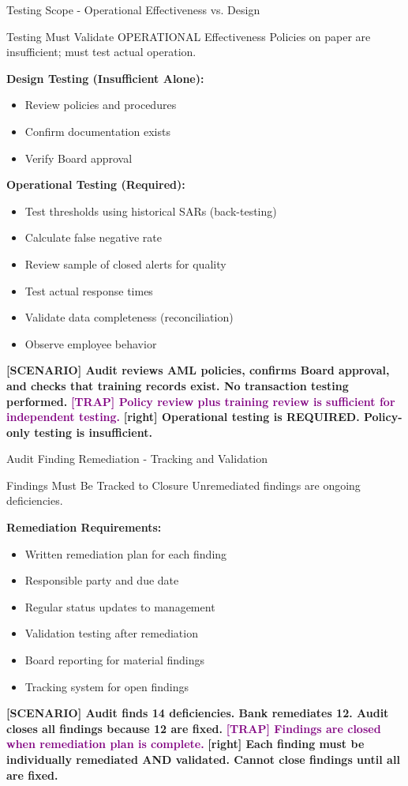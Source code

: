 \documentclass[11pt,a4paper]{beamer}
\newcommand{\trap}[1]{\textcolor{purple}{\textbf{[TRAP] #1}}}
\newcommand{\correct}[1]{\textcolor{green!50!black}{\textbf{[right] #1}}}
\newcommand{\scenario}[1]{\textcolor{blue!70!black}{\textbf{[SCENARIO] #1}}}
\begin{document}
\begin{frame}{Testing Scope - Operational Effectiveness vs. Design}
\begin{block}{Testing Must Validate OPERATIONAL Effectiveness}
Policies on paper are insufficient; must test actual operation.
\end{block}
\textbf{Design Testing (Insufficient Alone):}
\begin{itemize}
\item Review policies and procedures
\item Confirm documentation exists
\item Verify Board approval
\end{itemize}
\textbf{Operational Testing (Required):}
\begin{itemize}
\item Test thresholds using historical SARs (back-testing)
\item Calculate false negative rate
\item Review sample of closed alerts for quality
\item Test actual response times
\item Validate data completeness (reconciliation)
\item Observe employee behavior
\end{itemize}
\scenario{Audit reviews AML policies, confirms Board approval, and checks that training records exist. No transaction testing performed.}
\trap{Policy review plus training review is sufficient for independent testing.}
\correct{Operational testing is REQUIRED. Policy-only testing is insufficient.}
\end{frame}

\begin{frame}{Audit Finding Remediation - Tracking and Validation}
\begin{block}{Findings Must Be Tracked to Closure}
Unremediated findings are ongoing deficiencies.
\end{block}
\textbf{Remediation Requirements:}
\begin{itemize}
\item Written remediation plan for each finding
\item Responsible party and due date
\item Regular status updates to management
\item Validation testing after remediation
\item Board reporting for material findings
\item Tracking system for open findings
\end{itemize}
\scenario{Audit finds 14 deficiencies. Bank remediates 12. Audit closes all findings because 12 are fixed.}
\trap{Findings are closed when remediation plan is complete.}
\correct{Each finding must be individually remediated AND validated. Cannot close findings until all are fixed.}
\end{frame}
\end{document}
